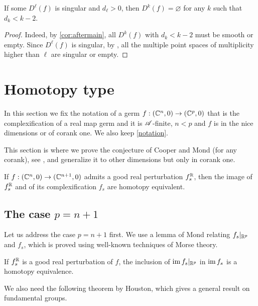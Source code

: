 \documentclass[a4paper,12pt]{amsart}
\begin{document}
\begin{corollary}\label{cor:aftermain2}
If some $D^\ell(f)$ is singular and $d_\ell>0$, then $D^k(f)=\varnothing$ for any $k$ such that $d_k< k-2$.
\end{corollary}
\begin{proof}
Indeed, by \cref{cor:aftermain}, all $D^k(f)$ with $d_k< k-2$ must be smooth or empty. Since $D^\ell(f)$ is singular, by \cite[Theorem 4.8]{GimenezConejero2022c}, all the multiple point spaces of multiplicity higher than $\ell$ are singular or empty.
\end{proof}

\section{Homotopy type}\label{sec:homotopy}

In this section we fix the notation of a germ $f:(\mathbb{C}^n,0)\to(\mathbb{C}^p,0)$ that is the complexification of a real map germ and it is $\mathscr{A}$-finite, $n<p$ and $f$ is in the nice dimensions or of corank one. We also keep \cref{notation}.

This section is where we prove the conjecture of Cooper and Mond (for any corank), see \cite[Conjecture 4.1]{Cooper1998}, and generalize it to other dimensions but only in corank one.

\begin{conjecture}\label{conj:grp}
If $f:(\mathbb{C}^n,0)\to(\mathbb{C}^{n+1},0)$ admits a good real perturbation $f_s^{\mathbb{R}}$, then the image of $f_s^{\mathbb{R}}$ and of its complexification $f_s$ are homotopy equivalent.
\end{conjecture}

\subsection{The case $p=n+1$}
Let us address the case $p=n+1$ first. We use a lemma of Mond relating $f_s|_{\mathbb{R}^p}$ and $f_s$, which is proved using well-known techniques of Morse theory.

\begin{lemma}\label{lem:mond}
If $f_s^{\mathbb{R}}$ is a good real perturbation of $f$, the inclusion of $\operatorname{im} f_s|_{\mathbb{R}^p}$ in $\operatorname{im} f_s$ is a homotopy equivalence.
\end{lemma}

We also need the following theorem by Houston, which gives a general result on fundamental groups.
\end{document}
